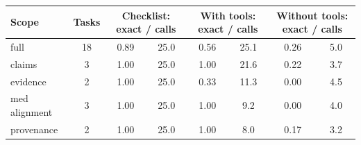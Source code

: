 \begin{tabular}{@{}lccccccc@{}}
\toprule
Scope & Tasks & \multicolumn{2}{c}{Checklist: exact / calls} & \multicolumn{2}{c}{With tools: exact / calls} & \multicolumn{2}{c}{Without tools: exact / calls} \\
\midrule
full & 18 & 0.89 & 25.0 & 0.56 & 25.1 & 0.26 & 5.0 \\
claims & 3 & 1.00 & 25.0 & 1.00 & 21.6 & 0.22 & 3.7 \\
evidence & 2 & 1.00 & 25.0 & 0.33 & 11.3 & 0.00 & 4.5 \\
med alignment & 3 & 1.00 & 25.0 & 1.00 & 9.2 & 0.00 & 4.0 \\
provenance & 2 & 1.00 & 25.0 & 1.00 & 8.0 & 0.17 & 3.2 \\
\bottomrule
\end{tabular}
